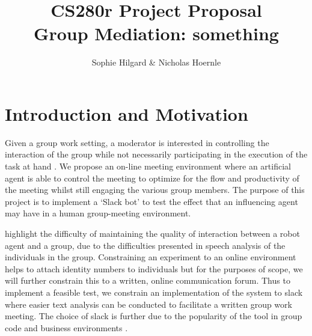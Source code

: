 \documentclass[final,authoryear,11pt,times]{elsarticle}
\begin{document}
\begin{frontmatter}

\title{CS280r Project Proposal \\ Group Mediation: something}


\author{Sophie Hilgard \& Nicholas Hoernle}


\end{frontmatter}

\section{Introduction and Motivation}
	\label{sec:introduction-motivation}
	Given a group work setting, a moderator is interested in controlling the interaction of the group while not necessarily participating in the execution of the task at hand \citep{short2015towards}. We propose an on-line meeting environment where an artificial agent is able to control the meeting to optimize for the flow and productivity of the meeting whilst still engaging the various group members. The purpose of this project is to implement a `Slack bot' to test the effect that an influencing agent may have in a human group-meeting environment.

	\citet{matsuyama2015four} highlight the difficulty of maintaining the quality of interaction between a robot agent and a group, due to the difficulties presented in speech analysis of the individuals in the group. Constraining an experiment to an online environment helps to attach identity numbers to individuals but for the purposes of scope, we will further constrain this to a written, online communication forum. Thus to implement a feasible test, we constrain an implementation of the system to slack where easier text analysis can be conducted to facilitate a written group work meeting. The choice of slack is further due to the popularity of the tool in group code and business environments \citep{jeffrey2016scientists}\citep{lebeuf2017software}.
\end{document}
